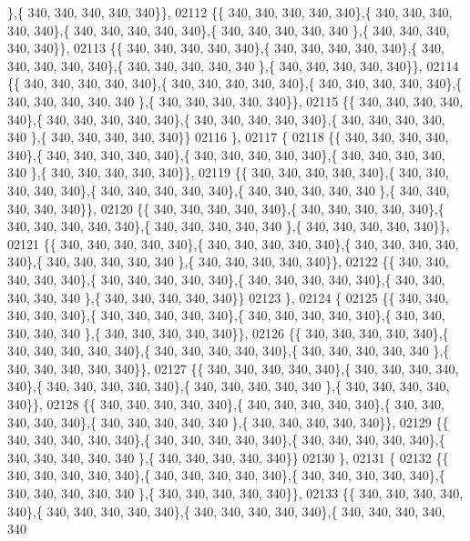 \begin{DoxyCode}
      \},\{ 340, 340, 340, 340, 340\}\},
02112 \{\{ 340, 340, 340, 340, 340\},\{ 340, 340, 340, 340, 340\},\{ 340, 340, 340, 340, 340\},\{ 340, 340, 340, 340, 340
      \},\{ 340, 340, 340, 340, 340\}\},
02113 \{\{ 340, 340, 340, 340, 340\},\{ 340, 340, 340, 340, 340\},\{ 340, 340, 340, 340, 340\},\{ 340, 340, 340, 340, 340
      \},\{ 340, 340, 340, 340, 340\}\},
02114 \{\{ 340, 340, 340, 340, 340\},\{ 340, 340, 340, 340, 340\},\{ 340, 340, 340, 340, 340\},\{ 340, 340, 340, 340, 340
      \},\{ 340, 340, 340, 340, 340\}\},
02115 \{\{ 340, 340, 340, 340, 340\},\{ 340, 340, 340, 340, 340\},\{ 340, 340, 340, 340, 340\},\{ 340, 340, 340, 340, 340
      \},\{ 340, 340, 340, 340, 340\}\}
02116 \},
02117 \{
02118 \{\{ 340, 340, 340, 340, 340\},\{ 340, 340, 340, 340, 340\},\{ 340, 340, 340, 340, 340\},\{ 340, 340, 340, 340, 340
      \},\{ 340, 340, 340, 340, 340\}\},
02119 \{\{ 340, 340, 340, 340, 340\},\{ 340, 340, 340, 340, 340\},\{ 340, 340, 340, 340, 340\},\{ 340, 340, 340, 340, 340
      \},\{ 340, 340, 340, 340, 340\}\},
02120 \{\{ 340, 340, 340, 340, 340\},\{ 340, 340, 340, 340, 340\},\{ 340, 340, 340, 340, 340\},\{ 340, 340, 340, 340, 340
      \},\{ 340, 340, 340, 340, 340\}\},
02121 \{\{ 340, 340, 340, 340, 340\},\{ 340, 340, 340, 340, 340\},\{ 340, 340, 340, 340, 340\},\{ 340, 340, 340, 340, 340
      \},\{ 340, 340, 340, 340, 340\}\},
02122 \{\{ 340, 340, 340, 340, 340\},\{ 340, 340, 340, 340, 340\},\{ 340, 340, 340, 340, 340\},\{ 340, 340, 340, 340, 340
      \},\{ 340, 340, 340, 340, 340\}\}
02123 \},
02124 \{
02125 \{\{ 340, 340, 340, 340, 340\},\{ 340, 340, 340, 340, 340\},\{ 340, 340, 340, 340, 340\},\{ 340, 340, 340, 340, 340
      \},\{ 340, 340, 340, 340, 340\}\},
02126 \{\{ 340, 340, 340, 340, 340\},\{ 340, 340, 340, 340, 340\},\{ 340, 340, 340, 340, 340\},\{ 340, 340, 340, 340, 340
      \},\{ 340, 340, 340, 340, 340\}\},
02127 \{\{ 340, 340, 340, 340, 340\},\{ 340, 340, 340, 340, 340\},\{ 340, 340, 340, 340, 340\},\{ 340, 340, 340, 340, 340
      \},\{ 340, 340, 340, 340, 340\}\},
02128 \{\{ 340, 340, 340, 340, 340\},\{ 340, 340, 340, 340, 340\},\{ 340, 340, 340, 340, 340\},\{ 340, 340, 340, 340, 340
      \},\{ 340, 340, 340, 340, 340\}\},
02129 \{\{ 340, 340, 340, 340, 340\},\{ 340, 340, 340, 340, 340\},\{ 340, 340, 340, 340, 340\},\{ 340, 340, 340, 340, 340
      \},\{ 340, 340, 340, 340, 340\}\}
02130 \},
02131 \{
02132 \{\{ 340, 340, 340, 340, 340\},\{ 340, 340, 340, 340, 340\},\{ 340, 340, 340, 340, 340\},\{ 340, 340, 340, 340, 340
      \},\{ 340, 340, 340, 340, 340\}\},
02133 \{\{ 340, 340, 340, 340, 340\},\{ 340, 340, 340, 340, 340\},\{ 340, 340, 340, 340, 340\},\{ 340, 340, 340, 340, 340

\end{DoxyCode}
